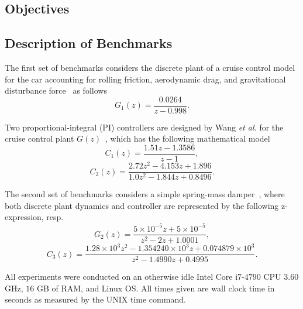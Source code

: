 \documentclass{sig-alternate-05-2015}
\begin{document}
\subsection{Objectives}
\label{experimental-objectives}

\subsection{Description of Benchmarks}
\label{experimental-setup}

The first set of benchmarks considers the discrete plant of a cruise 
control model for the car accounting for rolling friction, aerodynamic drag, 
and gravitational disturbance force~\cite{Astrom08} as follows
%
\begin{equation}
\label{cruise-control-c1}
G_1(z)=\frac{0.0264}{z-0.998}. \nonumber
\end{equation} 

Two proportional-integral (PI) controllers are designed by Wang {\it et al.} 
for the cruise control plant $G(z)$~\cite{DBLP:conf/hybrid/WangGRJF16}, 
which has the following mathematical model
%
\begin{equation}
\label{cruise-control-g1}
C_{1}(z)=\frac{1.51z-1.3586}{z-1}, \nonumber
\end{equation} 
%
\begin{equation}
\label{cruise-control-g2}
C_{2}(z)=\frac{2.72z^2 - 4.153z + 1.896}{1.0z^2 - 1.844z + 0.8496}. \nonumber
\end{equation} 

The second set of benchmarks considers a simple spring-mass 
damper~\cite{DBLP:conf/hybrid/WangGRJF16}, where both discrete 
plant dynamics and controller are represented by the following 
z-expression, resp.
%
\begin{equation}
\label{spring-mass-damper-g}
G_2(z)=\frac{5\times{10^{-5}}z + 5\times{10^{-5}}}{z^2 - 2z + 1.0001}, \nonumber
\end{equation} 
%
\begin{equation}
\label{spring-mass-damper-c}
C_3(z)=\frac{1.28\times{10^{3}}z^2 - 1.354240\times{10^{3}}z + 0.074879\times{10^{3}}}{z^2 - 1.4990z + 0.4995}. \nonumber
\end{equation} 


All experiments were conducted on an otherwise idle Intel Core i$7$-$4790$ 
CPU $3$.$60$ GHz, $16$ GB of RAM, and Linux OS.  All times given are wall 
clock time in seconds as measured by the UNIX time command.
\end{document}
